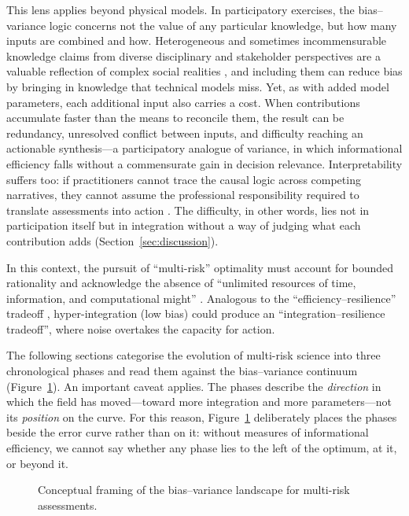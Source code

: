 \documentclass[12pt]{article}
\begin{document}
This lens applies beyond physical models. In participatory exercises, the bias--variance logic concerns not the value of any particular knowledge, but how many inputs are combined and how. Heterogeneous and sometimes incommensurable knowledge claims from diverse disciplinary and stakeholder perspectives are a valuable reflection of complex social realities \citep{Schlter2024NavigatingCRA, rusca_water_2026}, and including them can reduce bias by bringing in knowledge that technical models miss. Yet, as with added model parameters, each additional input also carries a cost. When contributions accumulate faster than the means to reconcile them, the result can be redundancy, unresolved conflict between inputs, and difficulty reaching an actionable synthesis---a participatory analogue of variance, in which informational efficiency falls without a commensurate gain in decision relevance. Interpretability suffers too: if practitioners cannot trace the causal logic across competing narratives, they cannot assume the professional responsibility required to translate assessments into action \citep{pereira2024integrating}. The difficulty, in other words, lies not in participation itself but in integration without a way of judging what each contribution adds (Section~\ref{sec:discussion}).

In this context, the pursuit of ``multi-risk'' optimality must account for bounded rationality \citep{Simon1956, Simon1947} and acknowledge the absence of ``unlimited resources of time, information, and computational might'' \citep{gigerenzer2020bounded}. Analogous to the ``efficiency--resilience'' tradeoff \citep{Hynes2020}, hyper-integration (low bias) could produce an ``integration--resilience tradeoff'', where noise overtakes the capacity for action.

The following sections categorise the evolution of multi-risk science into three chronological phases and read them against the bias--variance continuum \citep{Dunant2021} (Figure~\ref{fig:BV-figure}). An important caveat applies. The phases describe the \textit{direction} in which the field has moved---toward more integration and more parameters---not its \textit{position} on the curve. For this reason, Figure~\ref{fig:BV-figure} deliberately places the phases beside the error curve rather than on it: without measures of informational efficiency, we cannot say whether any phase lies to the left of the optimum, at it, or beyond it.


\begin{figure}[H]
    \centering
    \resizebox{\linewidth}{!}{}
    \caption{Conceptual framing of the bias--variance landscape for multi-risk assessments.}
    \label{fig:BV-figure}
\end{figure}
\end{document}
